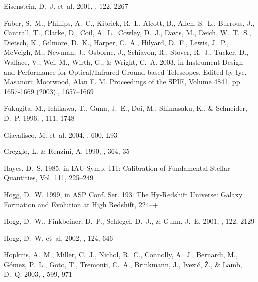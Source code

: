 \documentclass[12pt,preprint]{aastex}
\begin{document}
\begin{thebibliography}{44}
Eisenstein, D.~J. {et~al.} 2001, \aj, 122, 2267

{Faber}, S.~M., {Phillips}, A.~C., {Kibrick}, R.~I., {Alcott}, B., {Allen},
  S.~L., {Burrous}, J., {Cantrall}, T., {Clarke}, D., {Coil}, A.~L., {Cowley},
  D.~J., {Davis}, M., {Deich}, W.~T.~S., {Dietsch}, K., {Gilmore}, D.~K.,
  {Harper}, C.~A., {Hilyard}, D.~F., {Lewis}, J.~P., {McVeigh}, M., {Newman},
  J., {Osborne}, J., {Schiavon}, R., {Stover}, R.~J., {Tucker}, D., {Wallace},
  V., {Wei}, M., {Wirth}, G., \& {Wright}, C.~A. 2003, in Instrument Design and
  Performance for Optical/Infrared Ground-based Telescopes. Edited by Iye,
  Masanori; Moorwood, Alan F. M. Proceedings of the SPIE, Volume 4841, pp.
  1657-1669 (2003)., 1657--1669

Fukugita, M., Ichikawa, T., Gunn, J.~E., Doi, M., Shimasaku, K., \& Schneider,
  D.~P. 1996, \aj, 111, 1748

{Giavalisco}, M. {et~al.} 2004, \apjl, 600, L93

{Greggio}, L. \& {Renzini}, A. 1990, \apj, 364, 35

{Hayes}, D.~S. 1985, in IAU Symp. 111: Calibration of Fundamental Stellar
  Quantities, Vol. 111, 225--249

{Hogg}, D.~W. 1999, in ASP Conf. Ser. 193: The Hy-Redshift Universe: Galaxy
  Formation and Evolution at High Redshift, 224--+

{Hogg}, D.~W., {Finkbeiner}, D.~P., {Schlegel}, D.~J., \& {Gunn}, J.~E. 2001,
  \aj, 122, 2129

Hogg, D.~W. {et~al.} 2002, \aj, 124, 646

{Hopkins}, A.~M., {Miller}, C.~J., {Nichol}, R.~C., {Connolly}, A.~J.,
  {Bernardi}, M., {G{\'o}mez}, P.~L., {Goto}, T., {Tremonti}, C.~A.,
  {Brinkmann}, J., {Ivezi{\'c}}, {\v Z}., \& {Lamb}, D.~Q. 2003, \apj, 599, 971


\end{thebibliography}
\end{document}
